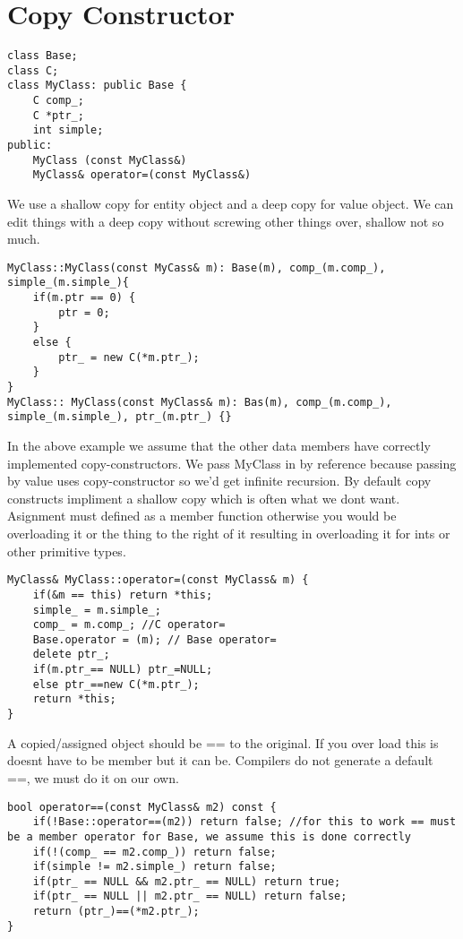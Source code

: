\documentclass[12pt]{article}
\begin{document}
\section*{Copy Constructor}
\begin{verbatim}
class Base;
class C;
class MyClass: public Base {
    C comp_;
    C *ptr_;
    int simple;
public:
    MyClass (const MyClass&)
    MyClass& operator=(const MyClass&)
\end{verbatim}
We use a shallow copy for entity object and a deep copy for value object. We can edit things with a deep copy without screwing other things over, shallow not so much. 

\begin{verbatim}
MyClass::MyClass(const MyCass& m): Base(m), comp_(m.comp_), simple_(m.simple_){
    if(m.ptr == 0) {
        ptr = 0;
    }
    else {
        ptr_ = new C(*m.ptr_);
    }
}
MyClass:: MyClass(const MyClass& m): Bas(m), comp_(m.comp_), simple_(m.simple_), ptr_(m.ptr_) {}
\end{verbatim}
In the above example we assume that the other data members have correctly implemented copy-constructors. We pass MyClass in by reference because passing by value uses copy-constructor so we'd get infinite recursion. By default copy constructs impliment a shallow copy which is often what we dont want. Asignment must defined as a member function otherwise you would be overloading it or the thing to the right of it resulting in overloading it for ints or other primitive types. 
\begin{verbatim}
MyClass& MyClass::operator=(const MyClass& m) {
    if(&m == this) return *this;
    simple_ = m.simple_; 
    comp_ = m.comp_; //C operator=
    Base.operator = (m); // Base operator=
    delete ptr_;
    if(m.ptr_== NULL) ptr_=NULL;
    else ptr_==new C(*m.ptr_);
    return *this;
}
\end{verbatim}

A copied/assigned object should be == to the original. If you over load this is doesnt have to be member but it can be. Compilers do not generate a default ==, we must do it on our own.
\begin{verbatim}
bool operator==(const MyClass& m2) const {
    if(!Base::operator==(m2)) return false; //for this to work == must be a member operator for Base, we assume this is done correctly
    if(!(comp_ == m2.comp_)) return false;
    if(simple != m2.simple_) return false;
    if(ptr_ == NULL && m2.ptr_ == NULL) return true;
    if(ptr_ == NULL || m2.ptr_ == NULL) return false;
    return (ptr_)==(*m2.ptr_);
}
\end{verbatim} 
\end{document}
